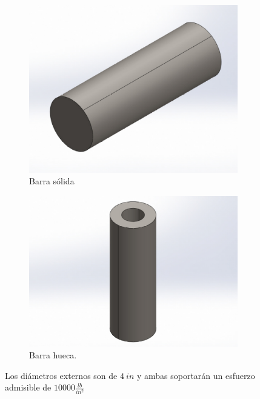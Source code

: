\documentclass[12pt, letterpaper]{article}
\begin{document}
\begin{figure}[H]
	\centering
	\begin{subfigure}[b]{0.49\linewidth}
		\includegraphics[width=\linewidth]{s.png}
		\caption{Barra sólida}
	\end{subfigure}
	\begin{subfigure}[b]{0.49\linewidth}
		\includegraphics[width=\linewidth]{h.png}
		\caption{Barra hueca.}
	\end{subfigure}
	\caption{Los diámetros externos son de $4\ in$ y ambas soportarán un esfuerzo admisible de $10000 \frac{lb}{in^2}$}
\end{figure}
\end{document}
